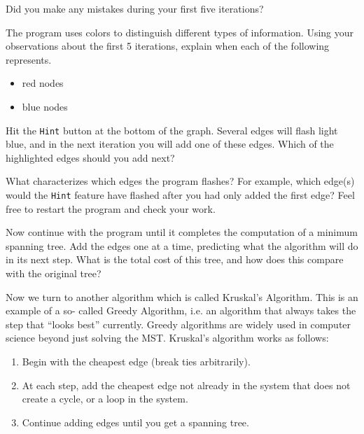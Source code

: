 \documentclass[fullpage,fleqn,leqno]{article}
\begin{document}
Did you make any mistakes during your first five iterations?

\vspace*{6\baselineskip}

The program uses colors to distinguish different types of
information. Using your observations about the first 5 iterations,
explain when each of the following represents.

\begin{itemize}
\item red nodes
\item blue nodes
\end{itemize}
\vspace*{4\baselineskip}


Hit the \texttt{Hint} button at the bottom of the graph.  Several edges will flash light blue, and in the next iteration you will add one of these edges. Which of the highlighted edges should you add next?  

\vspace*{4\baselineskip}

What characterizes which edges the program flashes?  For example, which edge(s) would the \texttt{Hint} feature have flashed after you had only added the first edge?  Feel free to restart the program and check your work.

\clearpage

Now continue with the program until it completes the computation of a
minimum spanning tree.  Add the edges one at a time, predicting what the algorithm will do in its next step. What is the total
cost of this tree, and how does this compare with the original tree?


\vspace*{6\baselineskip}

Now we turn to another algorithm which is called Kruskal's
Algorithm. This is an example of a so- called Greedy Algorithm,
i.e. an algorithm that always takes the step that ``looks best''
currently. Greedy algorithms are widely used in computer science
beyond just solving the MST. Kruskal's algorithm works as follows:

\begin{enumerate}
\item Begin with the cheapest edge (break ties arbitrarily).
\item At each step, add the cheapest edge not already in the system that
does not create a cycle, or a loop in the system.
\item Continue adding edges until you get a spanning tree.
\end{enumerate}
\end{document}
